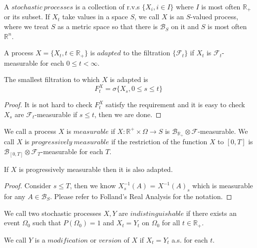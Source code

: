\documentclass[lang=en, color=blue, ]{elegantbook}
\newcommand{\F}{\mathcal{F}}
\newcommand{\R}{\mathbb{R}}
\newcommand{\B}{\mathcal{B}}
\begin{document}
\begin{definition}
    A $stochastic\ processes$ is a collection of r.v.s $\{X_i,i\in I\}$ where $I$ is most often $\R_+$ or its subset. If $X_t$ take values in a space $S$, we call $X$ is an $S$-valued process, where we treat $S$ as a metric space so that there is $\B_S$ on it and $S$ is most often $\R^n$.
\end{definition}

\begin{definition}
    A process $X = \{X_t, t\in\R_+\}$ is $adapted$ to the filtration $\{\F_t\}$ if $X_t$ is $\F_t$-measurable for each $0\leq t < \infty$.
\end{definition}

\begin{proposition}
 The smallest filtration to which $X$ is adapted is 
    \[F_t^X = \sigma\{X_s, 0\leq s \leq t\}\]
\end{proposition}
\begin{proof}\par
It is not hard to check $F_t^X$ satisfy the requirement and it is easy to check $X_s$ are $\F_t$-measurable if $s\leq t$, then we are done.
\end{proof}

\begin{definition}
    We call a process $X$ is $measurable$ if $X: \R^+\times \Omega \to S$ is $\B_{\R_+}\otimes \F$-measurable. We call $X$ is $progressively\ measurable$ if the restriction of the function $X$ to $[0,T]$ is $\B_{[0,T]}\otimes \F_T$-measurable for each $T$.
\end{definition}
\begin{proposition}
    If $X$ is progressively measurable then it is also adapted.
\end{proposition}
\begin{proof}\par
Consider $s\leq T$, then we know $X_s^{-1}(A)$ = $X^{-1}(A)_s$ which is measurable for any $A\in \B_S$. Please refer to Folland's Real Analysis for the notation.   
\end{proof}

\begin{definition}
    We call two stochastic processes $X,Y$ are $indistinguishable$ if there exists an event $\Omega_0$ such that $P(\Omega_0)=1$ and $X_t = Y_t$ on $\Omega_0$ for all $t\in\R_+$.\par
    We call $Y$ is a $modification$ or $version$ of $X$ if $X_t = Y_t$ a.s. for each $t$.
\end{definition}
\end{document}
